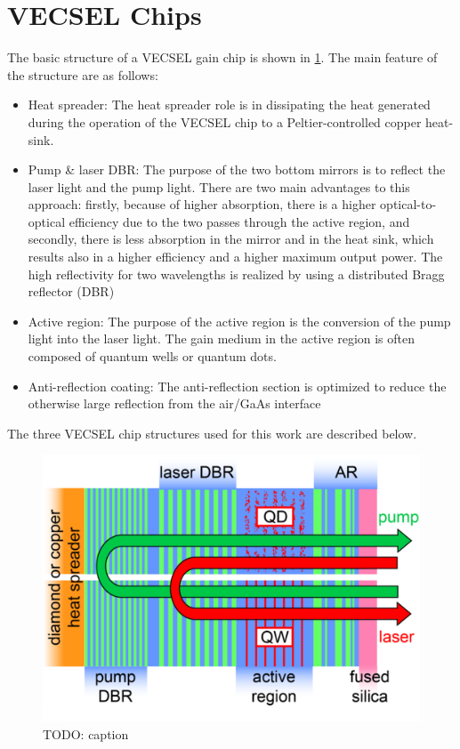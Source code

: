 \section{VECSEL Chips}\label{sec:vecsel}

The basic structure of a VECSEL gain chip is shown in \cref{fig:vecDes}. The main feature of the structure are as follows: 

\begin{itemize}
    \item Heat spreader: The heat spreader role is in dissipating the heat generated during the operation of the VECSEL chip to a Peltier-controlled copper heat-sink.
    \item Pump \& laser  DBR: The purpose of the two bottom mirrors is to reflect the laser light and the pump light. There are two main advantages to this approach: firstly, because of higher absorption, there is a higher optical-to-optical efficiency due to the two passes through the active region, and secondly, there is less absorption in the mirror and in the heat sink, which results also in a higher efficiency and a higher maximum output power. The high reflectivity for two wavelengths is realized by using a distributed Bragg reflector (DBR)
    \item Active region: The purpose of the active region is the conversion of the pump light into the laser light. The gain medium in the active region is often composed of quantum wells or quantum dots.
    \item Anti-reflection coating: The anti-reflection section is optimized to reduce the otherwise large reflection from the air/GaAs interface
\end{itemize}

The three VECSEL chip structures used for this work are described below.

\begin{figure}[ht]
    \centering
    \includegraphics[width=.6\linewidth]{images/VECSEL_structure.png}
    \caption{TODO: caption}
    \label{fig:vecDes}
\end{figure}

